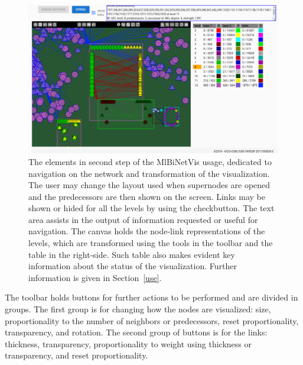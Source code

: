 \documentclass[runningheads]{llncs}
\begin{document}
\begin{figure}[!h]\centering
 \includegraphics[width=\textwidth]{secondPhase}
  \caption{The elements in second step of the MlBiNetVis usage, dedicated to navigation on the network and transformation of the visualization.
  The user may change the layout used when supernodes are opened and the predecessors are then shown on the screen.
  Links may be shown or hided for all the levels by using the checkbutton.
  The text area assists in the output of information requested or useful for navigation.
  The canvas holds the node-link representations of the levels, which are transformed using the tools in the toolbar and the table in the right-side.
  Such table also makes evident key information about the status of the visualization.
  Further information is given in Section~\ref{use}.
  }\label{secondPhase}
\end{figure}

The toolbar holds buttons for further actions to be performed and are divided in groups.
The first group is for changing how the nodes are visualized: size, proportionality to
the number of neighbors or predecessors, reset proportionality, transparency, and rotation.
The second group of buttons is for the links: thickness, transparency, proportionality to weight
using thickness or transparency, and reset proportionality.
\end{document}
